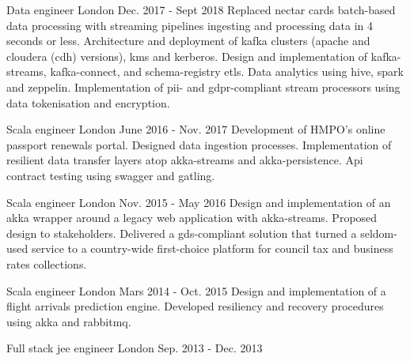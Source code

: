 \begin{cventries}
  \cventry
    {Data engineer} %
    {} %
    {London} %
    {Dec. 2017 - Sept 2018} %
    {} %
    {
Replaced nectar cards batch-based data processing with streaming pipelines ingesting and processing data in 4 seconds or less.
Architecture and deployment of kafka clusters (apache and cloudera (cdh) versions), kms and kerberos. 
Design and implementation of kafka-streams, kafka-connect, and schema-registry etls. Data analytics using hive, spark and zeppelin.
Implementation of pii- and gdpr-compliant stream processors using data tokenisation and encryption.
    }

  \cventry
    {Scala engineer} %
    {} %
    {London} %
    {June 2016 - Nov. 2017} %
    {} %
    {
Development of HMPO's online passport renewals portal. Designed data ingestion processes.
Implementation of resilient data transfer layers atop akka-streams and akka-persistence.
Api contract testing using swagger and gatling.
    }

  \cventry
    {Scala engineer} %
    {} %
    {London} %
    {Nov. 2015 - May 2016} %
    {} %
    {
Design and implementation of an akka wrapper around a legacy web application with akka-streams. Proposed design to stakeholders.
Delivered a gds-compliant solution that turned a seldom-used service to a country-wide first-choice platform for council tax and business rates collections.
    }

  \cventry
    {Scala engineer} %
    {} %
    {London} %
    {Mars 2014 - Oct. 2015} %
    {} %
    {
Design and implementation of a flight arrivals prediction engine. Developed resiliency and recovery procedures using akka and rabbitmq.
    }

  \cventry
    {Full stack jee engineer} %
    {} %
    {London} %
    {Sep. 2013 - Dec. 2013} %
    {}
    {}


\end{cventries}
